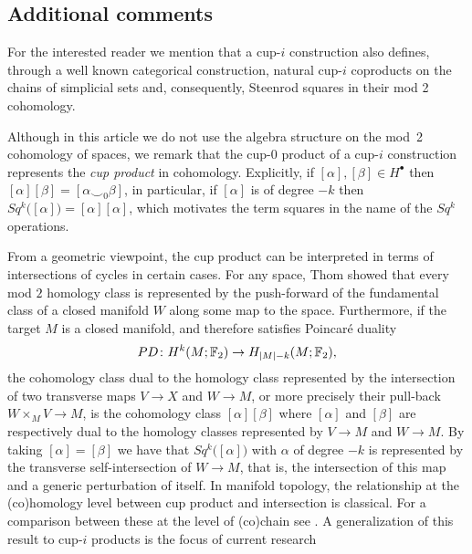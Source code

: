 \subsection{Additional comments}

\begin{remark}
	For the interested reader we mention that a cup-$i$ construction also defines, through a well known categorical construction, natural cup-$i$ coproducts on the chains of simplicial sets \cite{friedman2012simplicial} and, consequently, Steenrod squares in their mod 2 cohomology.
\end{remark}

\begin{remark} \label{r:cup product}
	Although in this article we do not use the algebra structure on the mod~2 cohomology of spaces, we remark that the cup-$0$ product of a cup-$i$ construction represents the \textit{cup product} in cohomology.
	Explicitly, if $[\alpha], [\beta] \in H^\bullet$ then $[\alpha][\beta] = [\alpha \smallsmile_0 \beta]$, in particular, if $[\alpha]$ is of degree $-k$ then $Sq^k\big([\alpha]\big) = [\alpha] [\alpha]$, which motivates the term squares in the name of the $Sq^k$ operations.
\end{remark}

\begin{remark}
	From a geometric viewpoint, the cup product can be interpreted in terms of intersections of cycles in certain cases.
	For any space, Thom showed that every mod $2$ homology class is represented by the push-forward of the fundamental class of a closed manifold $W$ along some map to the space.
	Furthermore, if the target $M$ is a closed manifold, and therefore satisfies Poincar\'{e} duality
	\[
	PD \colon H^k(M ;{\mathbb{F}_2}) \to H_{\lvert M\rvert-k}(M; {\mathbb{F}_2}),
	\]
	the cohomology class dual to the homology class represented by the intersection of two transverse maps $V \to X$ and $W \to M$, or more precisely their pull-back $W \times_M V \to M$, is the cohomology class $[\alpha] [\beta]$ where $[\alpha]$ and $[\beta]$ are respectively dual to the homology classes represented by $V \to M$ and $W \to M$.
	By taking $[\alpha] = [\beta]$ we have that $Sq^k \big( [\alpha] \big)$ with $\alpha$ of degree $-k$ is represented by the transverse self-intersection of $W \to M$, that is, the intersection of this map and a generic perturbation of itself.
	In manifold topology, the relationship at the (co)homology level between cup product and intersection is classical.
	For a comparison between these at the level of (co)chain see \cite{medina2021flowing}.
	A generalization of this result to cup-$i$ products is the focus of current research \cite{medina2022foundations}
\end{remark}

